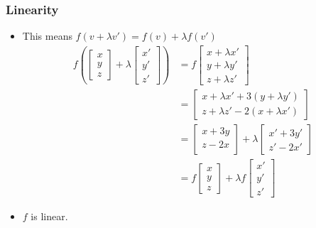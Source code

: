 \documentclass[8pt]{beamer}
\begin{document}
\begin{frame}
  \frametitle{Linearity}
  \begin{itemize}
  \item This means $f(v+ \lambda v') = f(v) + \lambda f(v')$
    \begin{align*}
     f\left(
    \begin{bmatrix}
      x\\y\\z
    \end{bmatrix}+\lambda
    \begin{bmatrix}
      x'\\y'\\z'
    \end{bmatrix}
    \right)
    &= f
    \begin{bmatrix}
      x+\lambda x'\\y+\lambda y'\\z+\lambda z'
    \end{bmatrix}\\
    &=
    \begin{bmatrix}
      x+\lambda x'+3(y+\lambda y')\\
      z+\lambda z'-2(x+\lambda x')
    \end{bmatrix}\\
    &=
    \begin{bmatrix}
      x+3y\\
      z-2x\\
    \end{bmatrix}
    +\lambda 
    \begin{bmatrix}
      x'+3y'\\
      z'-2x'
    \end{bmatrix}\\
    &= f
    \begin{bmatrix}
      x\\y\\z
    \end{bmatrix}
    + \lambda f
    \begin{bmatrix}
      x'\\y'\\z'
    \end{bmatrix}
  \end{align*}
\item $f$ is linear.
\end{itemize}
\end{frame}
\end{document}
